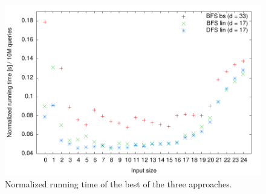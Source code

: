 \begin{figure}[h!]

  \centering
  \includegraphics[width=\textwidth]{../week1/plots/outputs/bfs_dfs_16_runningtime}
  \caption{Normalized running time of the best of the three approaches.}
  \label{fig:champions}
\end{figure}
